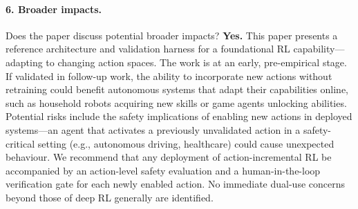 \documentclass{article}
\begin{document}
\paragraph{6. Broader impacts.}
Does the paper discuss potential broader impacts?
\textbf{Yes.} This paper presents a reference architecture and validation
harness for a foundational RL capability---adapting to changing action spaces.
The work is at an early, pre-empirical stage. If validated in follow-up work,
the ability to incorporate new actions without retraining could benefit
autonomous systems that adapt their capabilities online, such as household
robots acquiring new skills or game agents unlocking abilities. Potential risks
include the safety implications of enabling new actions in deployed
systems---an agent that activates a previously unvalidated action in a
safety-critical setting (e.g., autonomous driving, healthcare) could cause
unexpected behaviour. We recommend that any deployment of action-incremental
RL be accompanied by an action-level safety evaluation and a human-in-the-loop
verification gate for each newly enabled action. No immediate dual-use
concerns beyond those of deep RL generally are identified.
\end{document}
